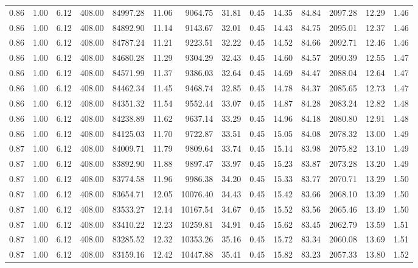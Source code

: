 \begin{table}[!ht]
\begin{tabular}{rrrrrrrrrrrrrr}
0.86 & 1.00 & 6.12 & 408.00 & 84997.28 & 11.06 & 9064.75 & 31.81 & 0.45 & 14.35 & 84.84 & 2097.28 & 12.29 & 1.46 \\
0.86 & 1.00 & 6.12 & 408.00 & 84892.90 & 11.14 & 9143.67 & 32.01 & 0.45 & 14.43 & 84.75 & 2095.01 & 12.37 & 1.46 \\
0.86 & 1.00 & 6.12 & 408.00 & 84787.24 & 11.21 & 9223.51 & 32.22 & 0.45 & 14.52 & 84.66 & 2092.71 & 12.46 & 1.46 \\
0.86 & 1.00 & 6.12 & 408.00 & 84680.28 & 11.29 & 9304.29 & 32.43 & 0.45 & 14.60 & 84.57 & 2090.39 & 12.55 & 1.47 \\
0.86 & 1.00 & 6.12 & 408.00 & 84571.99 & 11.37 & 9386.03 & 32.64 & 0.45 & 14.69 & 84.47 & 2088.04 & 12.64 & 1.47 \\
0.86 & 1.00 & 6.12 & 408.00 & 84462.34 & 11.45 & 9468.74 & 32.85 & 0.45 & 14.78 & 84.37 & 2085.65 & 12.73 & 1.47 \\
0.86 & 1.00 & 6.12 & 408.00 & 84351.32 & 11.54 & 9552.44 & 33.07 & 0.45 & 14.87 & 84.28 & 2083.24 & 12.82 & 1.48 \\
0.86 & 1.00 & 6.12 & 408.00 & 84238.89 & 11.62 & 9637.14 & 33.29 & 0.45 & 14.96 & 84.18 & 2080.80 & 12.91 & 1.48 \\
0.86 & 1.00 & 6.12 & 408.00 & 84125.03 & 11.70 & 9722.87 & 33.51 & 0.45 & 15.05 & 84.08 & 2078.32 & 13.00 & 1.49 \\
0.87 & 1.00 & 6.12 & 408.00 & 84009.71 & 11.79 & 9809.64 & 33.74 & 0.45 & 15.14 & 83.98 & 2075.82 & 13.10 & 1.49 \\
0.87 & 1.00 & 6.12 & 408.00 & 83892.90 & 11.88 & 9897.47 & 33.97 & 0.45 & 15.23 & 83.87 & 2073.28 & 13.20 & 1.49 \\
0.87 & 1.00 & 6.12 & 408.00 & 83774.58 & 11.96 & 9986.38 & 34.20 & 0.45 & 15.33 & 83.77 & 2070.71 & 13.29 & 1.50 \\
0.87 & 1.00 & 6.12 & 408.00 & 83654.71 & 12.05 & 10076.40 & 34.43 & 0.45 & 15.42 & 83.66 & 2068.10 & 13.39 & 1.50 \\
0.87 & 1.00 & 6.12 & 408.00 & 83533.27 & 12.14 & 10167.54 & 34.67 & 0.45 & 15.52 & 83.56 & 2065.46 & 13.49 & 1.50 \\
0.87 & 1.00 & 6.12 & 408.00 & 83410.22 & 12.23 & 10259.81 & 34.91 & 0.45 & 15.62 & 83.45 & 2062.79 & 13.59 & 1.51 \\
0.87 & 1.00 & 6.12 & 408.00 & 83285.52 & 12.32 & 10353.26 & 35.16 & 0.45 & 15.72 & 83.34 & 2060.08 & 13.69 & 1.51 \\
0.87 & 1.00 & 6.12 & 408.00 & 83159.16 & 12.42 & 10447.88 & 35.41 & 0.45 & 15.82 & 83.23 & 2057.33 & 13.80 & 1.52 \\

\end{tabular}
\end{table}
